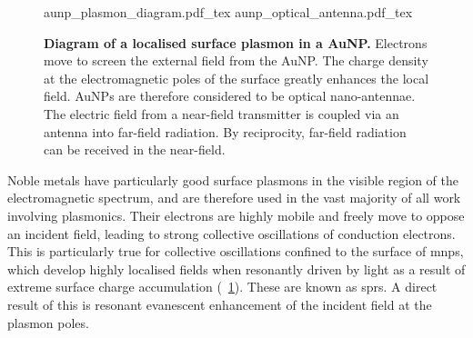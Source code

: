 \documentclass[12pt, a4paper, twoside]{book}
\begin{document}
\begin{figure}[bt]
\centering
\fontsize{10pt}{1em}\selectfont
\def\svgwidth{0.6\textwidth}
{aunp_plasmon_diagram.pdf_tex}
\def\svgwidth{0.35\textwidth}
{aunp_optical_antenna.pdf_tex}
\caption[Diagram of a localised surface plasmon in a AuNP.]{\textbf{Diagram of a localised surface plasmon in a AuNP.} Electrons move to screen the external field from the AuNP. The charge density at the electromagnetic poles of the surface greatly enhances the local field. AuNPs are therefore considered to be optical nano-antennae. The electric field from a near-field transmitter is coupled via an antenna into far-field radiation. By reciprocity, far-field radiation can be received in the near-field.}
\label{fig:aunp_plasmon}
\end{figure}

Noble metals have particularly good surface plasmons in the visible region of the electromagnetic spectrum, and are therefore used in the vast majority of all work involving plasmonics. Their electrons are highly mobile and freely move to oppose an incident field, leading to strong collective oscillations of conduction electrons. This is particularly true for collective oscillations confined to the surface of \glspl{mnp}, which develop highly localised fields when resonantly driven by light as a result of {\color{red} extreme} surface charge accumulation (\figurename~\ref{fig:aunp_plasmon}). These are known as \glspl{spr}.
A direct result of this is resonant evanescent enhancement of the incident field at the plasmon poles.

\end{document}
